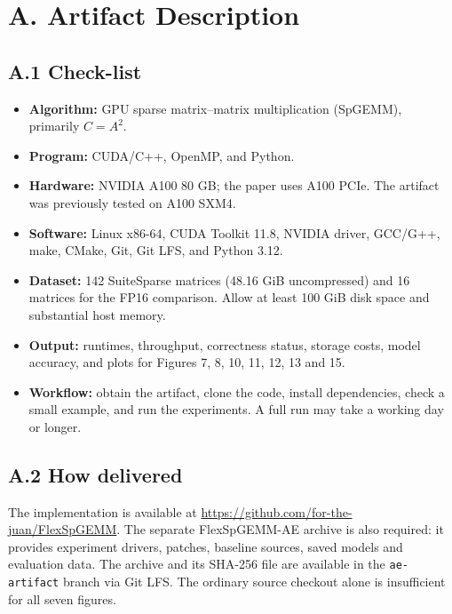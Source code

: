 \documentclass[10pt,twocolumn]{article}
\begin{document}
\section*{A. Artifact Description}
\subsection*{A.1 Check-list}
\begin{itemize}
\item \textbf{Algorithm:} GPU sparse matrix--matrix multiplication (SpGEMM), primarily $C=A^2$.
\item \textbf{Program:} CUDA/C++, OpenMP, and Python.
\item \textbf{Hardware:} NVIDIA A100 80 GB; the paper uses A100 PCIe. The artifact was previously tested on A100 SXM4.
\item \textbf{Software:} Linux x86-64, CUDA Toolkit 11.8, NVIDIA driver, GCC/G++, make, CMake, Git, Git LFS, and Python 3.12.
\item \textbf{Dataset:} 142 SuiteSparse matrices (48.16 GiB uncompressed) and 16 matrices for the FP16 comparison. Allow at least 100 GiB disk space and substantial host memory.
\item \textbf{Output:} runtimes, throughput, correctness status, storage costs, model accuracy, and plots for Figures 7, 8, 10, 11, 12, 13 and 15.
\item \textbf{Workflow:} obtain the artifact, clone the code, install dependencies, check a small example, and run the experiments. A full run may take a working day or longer.
\end{itemize}
\subsection*{A.2 How delivered}
The implementation is available at \url{https://github.com/for-the-juan/FlexSpGEMM}. The separate FlexSpGEMM-AE archive is also required: it provides experiment drivers, patches, baseline sources, saved models and evaluation data. The archive and its SHA-256 file are available in the \texttt{ae-artifact} branch via Git LFS. The ordinary source checkout alone is insufficient for all seven figures.
\end{document}
